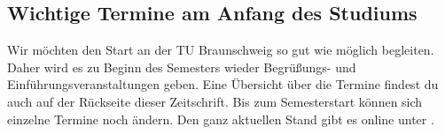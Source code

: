 
\subsection{Wichtige Termine am Anfang des Studiums}


Wir möchten den Start an der TU Braunschweig so gut wie möglich begleiten. Daher wird es zu Beginn des Semesters wieder Begrüßungs- und Einführungsveranstaltungen geben. Eine Übersicht über die Termine findest du auch auf der Rückseite dieser Zeitschrift. Bis zum Semesterstart können sich einzelne Termine noch ändern. Den ganz aktuellen Stand gibt es online unter .

\renewcommand{\labelitemi}{$\bullet$}
\renewcommand{\labelitemii}{$\bullet$}
\renewcommand{\labelitemiii}{$\bullet$}
\renewcommand{\labelitemiv}{$\bullet$}

